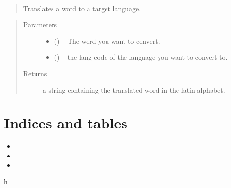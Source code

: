 \documentclass[letterpaper,10pt,english]{sphinxmanual}
\begin{document}

\begin{fulllineitems}
\label{code:hp_spells.translate2}~\begin{quote}

Translates a word to a target language.
\end{quote}
\begin{quote}\begin{description}
\item[{Parameters}] \leavevmode\begin{itemize}
\item {} 
 () -- The word you want to convert.

\item {} 
 () -- the lang code of the language you want to convert to.

\end{itemize}

\item[{Returns}] \leavevmode
a string containing the translated word in the latin alphabet.

\end{description}\end{quote}

\end{fulllineitems}



\chapter{Indices and tables}
\label{index:indices-and-tables}\begin{itemize}
\item {} 

\item {} 

\item {} 

\end{itemize}


\renewcommand{\indexname}{Python Module Index}
\begin{sphinxtheindex}
\def\bigletter#1{{\Large\sffamily#1}\nopagebreak\vspace{1mm}}
\bigletter{h}
\item {}
\end{sphinxtheindex}

\renewcommand{\indexname}{Index}
\printindex
\end{document}

